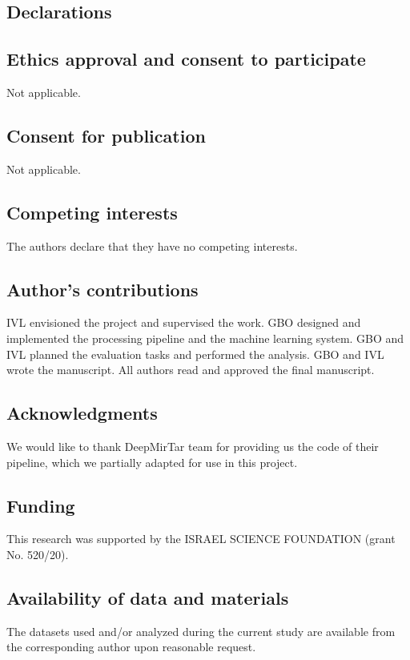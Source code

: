 \documentclass{bmcart}
\begin{document}
\begin{backmatter}
\section*{Declarations}

\subsection*{Ethics approval and consent to participate}
Not applicable.

\subsection*{Consent for publication}
Not applicable.

\subsection*{Competing interests}
The authors declare that they have no competing interests.

\subsection*{Author's contributions}
IVL envisioned the project and supervised the work. GBO designed and implemented the processing pipeline and the machine learning system. GBO and IVL planned the evaluation tasks and performed the analysis. GBO and IVL wrote the manuscript.  All authors read and approved the final manuscript.
    
\subsection*{Acknowledgments}
We would like to thank DeepMirTar team for providing us the code of their pipeline, which we partially adapted for use in this project.
  
\subsection*{Funding}
This research was supported by the ISRAEL SCIENCE FOUNDATION (grant No. 520/20).

\subsection*{Availability of data and materials}
The datasets used and/or analyzed during the current study are available from the corresponding author upon reasonable request.
 

\end{backmatter}
\end{document}
